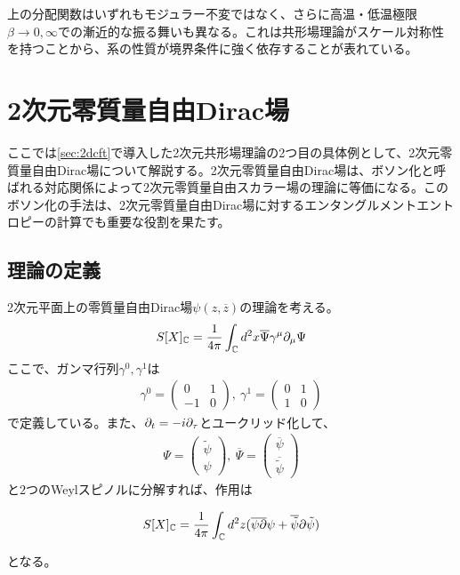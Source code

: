 上の分配関数はいずれもモジュラー不変ではなく、さらに高温・低温極限$\beta\to 0,\infty$での漸近的な振る舞いも異なる。これは共形場理論がスケール対称性を持つことから、系の性質が境界条件に強く依存することが表れている。

\section{2次元零質量自由Dirac場}\label{sec:2ddirac}
ここでは\ref{sec:2dcft}で導入した2次元共形場理論の2つ目の具体例として、2次元零質量自由Dirac場について解説する。2次元零質量自由Dirac場は、ボソン化と呼ばれる対応関係によって2次元零質量自由スカラー場の理論に等価になる。このボソン化の手法は、2次元零質量自由Dirac場に対するエンタングルメントエントロピーの計算でも重要な役割を果たす。

\subsection{理論の定義}
2次元平面上の零質量自由Dirac場$\psi(z,\overline{z})$の理論を考える。
\begin{align}
S[X]_{\mathbb{C}}=\frac{1}{4\pi}\int_{\mathbb{C}} d^2 x \overline{\Psi}\gamma^\mu\partial_\mu\Psi
\end{align}
ここで、ガンマ行列$\gamma^0,\gamma^1$は
\begin{align}
\gamma^0=\left(\begin{array}{cc}
0 & 1 \\
-1 & 0 \end{array}
\right),\ \gamma^1=\left(\begin{array}{cc}
0 & 1 \\
1 & 0 \end{array}
\right)
\end{align}
で定義している。また、$\partial_t=-i\partial_\tau$とユークリッド化して、
\begin{align}
\Psi=\left(\begin{array}{c}
\tilde{\psi} \\
\psi \end{array}
\right),\ \overline{\Psi}=\left(\begin{array}{c}
\overline{\psi} \\
\overline{\tilde{\psi}}\end{array}
\right)
\end{align}
と$2$つのWeylスピノルに分解すれば、作用は
\begin{oframed}
\begin{align}
S[X]_{\mathbb{C}}=\frac{1}{4\pi}\int_{\mathbb{C}} d^2 z (\overline{\psi}\overline{\partial}\psi+\overline{\tilde{\psi}}\partial\tilde{\psi})
\end{align}
\end{oframed}
となる。

